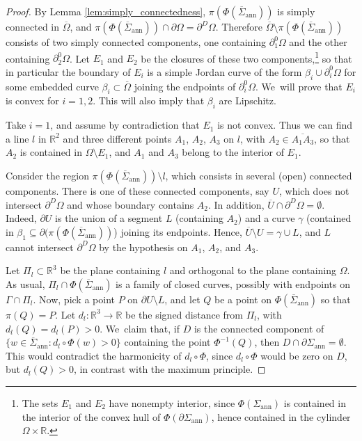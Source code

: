 \documentclass[JEP,XML,SOM,Unicode, NoFloatCountersInSection,published]{cedram}
\newcommand{\R}{\mathbb{R}}
\let\Om\Omega
\newcommand{\openannulus}{\Sigma_\mathrm{ann}}
\newcommand{\immclosedann}{\Phi({\overline\Sigma}_\mathrm{ann})}
\theoremstyle{definition}
\begin{document}
\begin{proof}
By Lemma \ref{lem:simply_connectedness}, $\pi(\immclosedann)$ is
simply connected in $\overline\Omega$, and $\pi(\immclosedann)\cap \partial\Om=\partial^D\Om$.
Therefore $\overline\Omega\setminus \pi(\immclosedann)$ consists of two simply connected components, one containing $\partial_1^0\Omega$ and the other containing $\partial_2^0\Om$.
Let $E_1$ and $E_2$ be the closures of these two components,\footnote{The sets $E_1$ and $E_2$ have nonempty interior, since $\Phi(\openannulus)$ is contained in the interior of the convex hull of $\Phi(\partial\openannulus)$, hence contained in the cylinder $\Omega\times\R$.}
so that in particular the boundary of $E_i$ is a
simple Jordan curve
of the form $ \beta_i\cup\partial_i^0\Om$ for some
embedded curve $\beta_i\subset\overline\Om$ joining the endpoints of $\partial_i^0\Om$. We~will prove that $E_i$ is convex for $i=1,2$.
This will also imply that $\beta_i$ are Lipschitz.

Take $i=1$, and assume by contradiction that $E_1$ is not convex.
Thus we can find a line $l$ in $\R^2$ and three different points $A_1$, $A_2$, $A_3$ on $l$, with $A_2\in\overline{A_1A_3}$, so that $A_2$ is contained in $\Om\setminus E_1$, and $A_1$ and $A_3$ belong to the interior of $E_1$.

Consider the region $\pi(\immclosedann)\setminus l$, which consists in several (open) connected components. There is one of
these connected components, say $U$,
which does not intersect $\partial^D\Om$ and
whose boundary contains $A_2$. In addition,
$\overline U \cap \partial^D\Om = \emptyset$.
Indeed, $\partial U$ is the union of a segment $L$ (containing $A_2$) and a curve $\gamma$ (contained in $\beta_1\subseteq\partial (\pi(\immclosedann)$) joining its endpoints.
Hence, $\overline U\setminus U=\gamma\cup L$, and $L$ cannot intersect $\partial^D\Om$ by the hypothesis on $A_1$, $A_2$, and $A_3$.

Let $\Pi_l\subset\R^3$ be the
plane containing $l$ and
orthogonal to the plane containing $\Om$.
As usual, $\Pi_l\cap
\immclosedann$ is a family of closed curves, possibly with endpoints on $\Gamma\cap \Pi_l$.
Now, pick a point $P$ on $\partial U\setminus L$, and let $Q$ be a point on $\immclosedann$ so that $\pi(Q)=P$.
Let $d_l:\R^3\to \R$ be the signed distance from $\Pi_l$,
with $d_l(Q)=d_l(P)>0$. We~claim that, if $D$ is the connected component of $\{w\in
\overline\Sigma_\mathrm{ann}:d_l\circ\Phi(w)>0\}$ containing the point $\Phi^{-1}(Q)$, then $D\cap \partial\openannulus=\emptyset$.
This would contradict the harmonicity of $d_l\circ\Phi$, since $d_l\circ\Phi$ would be zero
on $D$, but $d_l(Q)>0$, in contrast with the maximum principle.


\end{proof}
\end{document}
